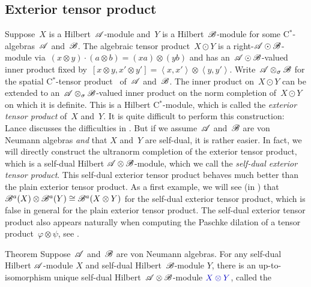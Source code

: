 \documentclass[b]{subfiles}
\begin{document}
\subsection{Exterior tensor product}
\begin{parsec}%
\begin{point}%
Suppose~$X$ is a Hilbert~$\mathscr{A}$-module
    and~$Y$ is a Hilbert~$\mathscr{B}$-module
    for some C$^*$-algebras~$\mathscr{A}$ and~$\mathscr{B}$.
The algebraic tensor product~$X \odot Y$
    is a right-$\mathscr{A} \odot \mathscr{B}$-module
    via~$(x\otimes y)\cdot (a\otimes b) = (xa) \otimes (yb)$
    and has an~$\mathscr{A} \odot \mathscr{B}$-valued inner
    product fixed by~$[x\otimes y, x'\otimes y']
        = \left<x,x'\right> \otimes \left<y,y'\right>$.
Write~$\mathscr{A} \otimes_\sigma \mathscr{B}$ for the spatial
    C$^*$-tensor product~\cite[\S11.3]{kr} of~$\mathscr{A}$ and~$\mathscr{B}$.
The inner product on~$X \odot Y$ can be extended
    to an~$\mathscr{A} \otimes_\sigma \mathscr{B}$-valued inner product
    on the norm completion of~$X \odot Y$
    on which it is definite. \cite{lance}
This is a Hilbert C$^*$-module,
    which is called the \emph{exterior tensor product} of~$X$ and~$Y$.
It is quite difficult to perform this construction:
    Lance discusses the difficulties in \cite[Ch.~4]{lance}.
But if we assume~$\mathscr{A}$ and~$\mathscr{B}$ are von Neumann algebras
    \emph{and} that $X$ and~$Y$ are self-dual,
    it is rather easier.
In fact, we will directly construct the ultranorm completion
    of the exterior tensor product,
    which is a self-dual Hilbert $\mathscr{A} \otimes \mathscr{B}$-module,
    which we call the \emph{self-dual exterior tensor product}.
This self-dual exterior tensor product
    behaves much better than the plain exterior tensor product.
    As a first example, we will see (in )
    that~$\mathscr{B}^a(X) \otimes \mathscr{B}^a(Y) \cong \mathscr{B}^a(X\otimes Y)$
        for the self-dual exterior tensor product,
        which is false in general for the plain exterior tensor product.
The self-dual exterior tensor product also appears naturally
    when computing the Paschke dilation
    of a tensor product~$\varphi \otimes \psi$, see .
\end{point}
\begin{point}{Theorem}%
Suppose~$\mathscr{A}$ and~$\mathscr{B}$ are von Neumann algebras.
For any self-dual Hilbert $\mathscr{A}$-module $X$
    and self-dual Hilbert~$\mathscr{B}$-module $Y$,
    there is an up-to-isomorphism unique
    self-dual Hilbert~$\mathscr{A}\otimes \mathscr{B}$-module
    $\Define{X \otimes Y}$, called the %

\end{point}
\end{parsec}
\end{document}
